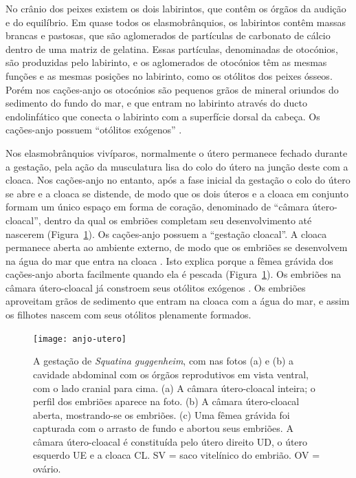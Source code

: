 \documentclass[a4paper,11pt,twoside,showtrims,onecolumn,openright,final]{memoir}
\begin{document}
No crânio dos peixes existem os dois labirintos, que contêm os órgãos da audição e do equilíbrio. 
Em quase todos os elasmobrânquios, os labirintos contêm massas brancas e pastosas, que são 
aglomerados de partículas de carbonato de cálcio dentro de uma matriz de gelatina. 
Essas partículas, denominadas de otocónios, são produzidas pelo labirinto, e os aglomerados 
de otocónios têm as mesmas funções e as mesmas posições no labirinto, como os otólitos 
dos peixes ósseos. Porém nos cações-anjo os otocónios são pequenos grãos de mineral
oriundos do sedimento do fundo do mar, e que entram no labirinto 
através do  ducto endolinfático que conecta o labirinto com a superfície dorsal da cabeça. 
Os cações-anjo possuem ``otólitos exógenos'' \citep{daniel1922}. %

Nos elasmobrânquios vivíparos, normalmente o útero permanece fechado durante a gestação, 
pela ação da musculatura lisa do colo do útero na  junção deste com a cloaca. Nos cações-anjo 
no entanto, após a fase inicial da gestação o colo do útero se abre e a cloaca se distende, 
de modo que os dois úteros e a cloaca em conjunto formam um único espaço em forma de coração, 
denominado de ``câmara útero-cloacal'', dentro da qual os embriões completam seu desenvolvimento 
até nascerem (Figura~\ref{fig:anjos-camara-utero-cloacal}). %
Os cações-anjo possuem a ``gestação cloacal''.  A cloaca permanece aberta ao ambiente externo, 
de modo que os embriões se desenvolvem na água do mar que entra na cloaca \citep{sunye1997}. %
Isto explica porque a fêmea grávida dos cações-anjo aborta facilmente quando ela é pescada (Figura~\ref{fig:anjos-camara-utero-cloacal}). %
Os embriões na câmara útero-cloacal já constroem seus otólitos exógenos \citep{miranda1998}. %
Os embriões aproveitam grãos de sedimento que entram na cloaca com a água do mar, e assim os 
filhotes nascem com seus otólitos plenamente formados. 

%
%

\begin{figure}
\begin{center}
\texttt{[image: anjo-utero]}
\end{center}
\caption[Câmara útero-cloacal de \emph{Squatina guggenheim}]
	{A gestação de \emph{Squatina guggenheim}, com nas fotos (a) e (b) a cavidade abdominal 
	 com os órgãos reprodutivos em vista ventral, com o lado cranial para cima. 
	 (a) A câmara útero-cloacal  inteira; o perfil dos embriões aparece na foto. 
	 (b) A câmara útero-cloacal aberta, mostrando-se os embriões. 
	 (c) Uma fêmea grávida foi capturada com o arrasto de fundo e abortou seus embriões. 
	 A câmara útero-cloacal é constituída pelo útero direito UD, o útero esquerdo UE 
	 e a cloaca CL. SV = saco vitelínico do embrião. OV = ovário.}
\label{fig:anjos-camara-utero-cloacal}
\end{figure}
\end{document}

